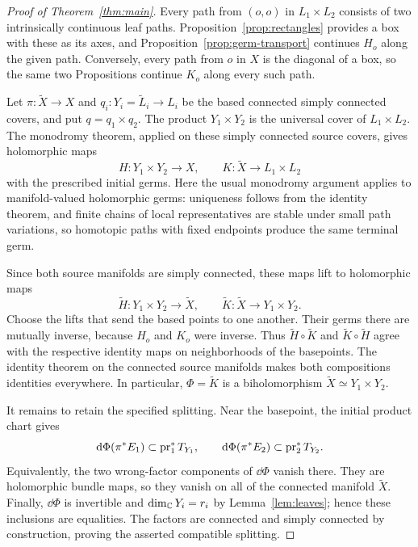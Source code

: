\begin{proof}[Proof of Theorem~\ref{thm:main}]
Every path from \((o,o)\) in \(L_1\times L_2\) consists of two
intrinsically continuous leaf paths. Proposition~\ref{prop:rectangles}
provides a box with these as its axes, and
Proposition~\ref{prop:germ-transport} continues \(H_o\) along the
given path. Conversely, every path from \(o\) in \(X\) is the
diagonal of a box, so the same two Propositions continue \(K_o\)
along every such path.

Let \(\pi:\widetilde X\to X\) and
\(q_i:Y_i=\widetilde L_i\to L_i\) be the based connected simply
connected covers, and put \(q=q_1\times q_2\). The product
\(Y_1\times Y_2\) is the universal cover of \(L_1\times L_2\).
The monodromy theorem, applied on these simply connected source covers,
gives holomorphic maps
\[
 H:Y_1\times Y_2\longrightarrow X,
 \qquad K:\widetilde X\longrightarrow L_1\times L_2
\]
with the prescribed initial germs. Here the usual monodromy argument
applies to manifold-valued holomorphic germs: uniqueness follows from
the identity theorem, and finite chains of local representatives are
stable under small path variations, so homotopic paths with fixed
endpoints produce the same terminal germ.

Since both source manifolds are simply connected, these maps lift to
holomorphic maps
\[
 \widetilde H:Y_1\times Y_2\longrightarrow\widetilde X,
 \qquad
 \widetilde K:\widetilde X\longrightarrow Y_1\times Y_2.
\]
Choose the lifts that send the based points to one another. Their germs
there are mutually inverse, because \(H_o\) and \(K_o\) were inverse.
Thus \(\widetilde H\circ\widetilde K\) and
\(\widetilde K\circ\widetilde H\) agree with the respective identity
maps on neighborhoods of the basepoints. The identity theorem on the
connected source manifolds makes both compositions identities
everywhere. In particular, \(\Phi=\widetilde K\) is a biholomorphism
\(\widetilde X\simeq Y_1\times Y_2\).

It remains to retain the specified splitting. Near the basepoint, the
initial product chart gives
\[
 \mathrm d\Phi(\pi^*E_1)\subset\operatorname{pr}_1^*T_{Y_1},\qquad
 \mathrm d\Phi(\pi^*E_2)\subset\operatorname{pr}_2^*T_{Y_2}.
\]
Equivalently, the two wrong-factor components of \(\dd\Phi\) vanish
there. They are holomorphic bundle maps, so they vanish on all of the
connected manifold \(\widetilde X\). Finally, \(\dd\Phi\) is
invertible and \(\dim_\mathbb C Y_i=r_i\) by Lemma~\ref{lem:leaves}; hence
these inclusions are equalities. The factors are connected and simply
connected by construction, proving the asserted compatible splitting.
\end{proof}
